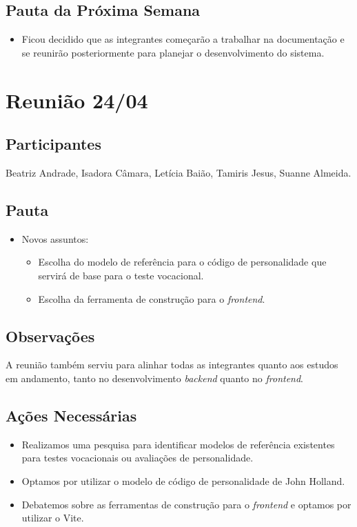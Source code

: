 \begin{apendicesenv}
\subsection*{Pauta da Próxima Semana}
\begin{itemize}
    \item Ficou decidido que as integrantes começarão a trabalhar na documentação e se reunirão posteriormente para planejar o desenvolvimento do sistema.
\end{itemize}

\section*{Reunião 24/04}

\subsection*{Participantes}
Beatriz Andrade, Isadora Câmara, Letícia Baião, Tamiris Jesus, Suanne Almeida.

\subsection*{Pauta}
\begin{itemize}
    \item Novos assuntos:
    \begin{itemize}
        \item Escolha do modelo de referência para o código de personalidade que servirá de base para o teste vocacional.
        \item Escolha da ferramenta de construção para o \textit{frontend}.
    \end{itemize}
\end{itemize}

\subsection*{Observações}
A reunião também serviu para alinhar todas as integrantes quanto aos estudos em andamento, tanto no desenvolvimento \textit{backend} quanto no \textit{frontend}.

\subsection*{Ações Necessárias}
\begin{itemize}
    \item Realizamos uma pesquisa para identificar modelos de referência existentes para testes vocacionais ou avaliações de personalidade.
    \item Optamos por utilizar o modelo de código de personalidade de John Holland.
    \item Debatemos sobre as ferramentas de construção para o \textit{frontend} e optamos por utilizar o Vite.
\end{itemize}


\end{apendicesenv}

